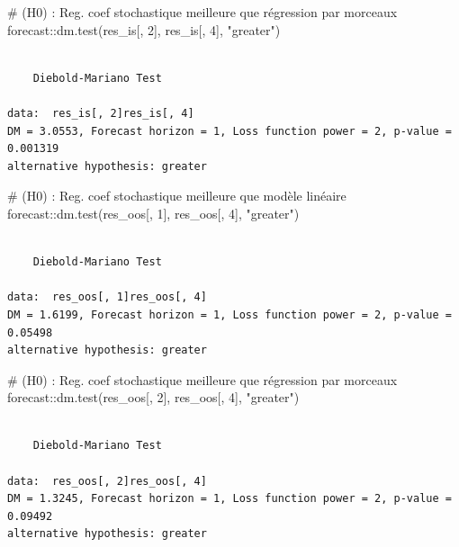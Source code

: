 \documentclass[
  a4paper,
  DIV=11,
  numbers=noendperiod,
  french]{scrartcl}
\newenvironment{Shaded}{\begin{snugshade}}{\end{snugshade}}
\newcommand{\CommentTok}[1]{\textcolor[rgb]{0.37,0.37,0.37}{#1}}
\newcommand{\DecValTok}[1]{\textcolor[rgb]{0.68,0.00,0.00}{#1}}
\newcommand{\FunctionTok}[1]{\textcolor[rgb]{0.28,0.35,0.67}{#1}}
\newcommand{\NormalTok}[1]{\textcolor[rgb]{0.00,0.23,0.31}{#1}}
\newcommand{\SpecialCharTok}[1]{\textcolor[rgb]{0.37,0.37,0.37}{#1}}
\newcommand{\StringTok}[1]{\textcolor[rgb]{0.13,0.47,0.30}{#1}}
\newcommand\1{{\mathds 1}}
\theoremstyle{remark}
\begin{document}
\begin{Shaded}
\begin{Highlighting}[]
\CommentTok{\# (H0) : Reg. coef stochastique meilleure que régression par morceaux}
\NormalTok{forecast}\SpecialCharTok{::}\FunctionTok{dm.test}\NormalTok{(res\_is[, }\DecValTok{2}\NormalTok{], res\_is[, }\DecValTok{4}\NormalTok{], }\StringTok{"greater"}\NormalTok{)}
\end{Highlighting}
\end{Shaded}

\begin{verbatim}

    Diebold-Mariano Test

data:  res_is[, 2]res_is[, 4]
DM = 3.0553, Forecast horizon = 1, Loss function power = 2, p-value =
0.001319
alternative hypothesis: greater
\end{verbatim}

\begin{Shaded}
\begin{Highlighting}[]
\CommentTok{\# (H0) : Reg. coef stochastique meilleure que modèle linéaire}
\NormalTok{forecast}\SpecialCharTok{::}\FunctionTok{dm.test}\NormalTok{(res\_oos[, }\DecValTok{1}\NormalTok{], res\_oos[, }\DecValTok{4}\NormalTok{], }\StringTok{"greater"}\NormalTok{)}
\end{Highlighting}
\end{Shaded}

\begin{verbatim}

    Diebold-Mariano Test

data:  res_oos[, 1]res_oos[, 4]
DM = 1.6199, Forecast horizon = 1, Loss function power = 2, p-value =
0.05498
alternative hypothesis: greater
\end{verbatim}

\begin{Shaded}
\begin{Highlighting}[]
\CommentTok{\# (H0) : Reg. coef stochastique meilleure que régression par morceaux}
\NormalTok{forecast}\SpecialCharTok{::}\FunctionTok{dm.test}\NormalTok{(res\_oos[, }\DecValTok{2}\NormalTok{], res\_oos[, }\DecValTok{4}\NormalTok{], }\StringTok{"greater"}\NormalTok{)}
\end{Highlighting}
\end{Shaded}

\begin{verbatim}

    Diebold-Mariano Test

data:  res_oos[, 2]res_oos[, 4]
DM = 1.3245, Forecast horizon = 1, Loss function power = 2, p-value =
0.09492
alternative hypothesis: greater
\end{verbatim}
\end{document}
